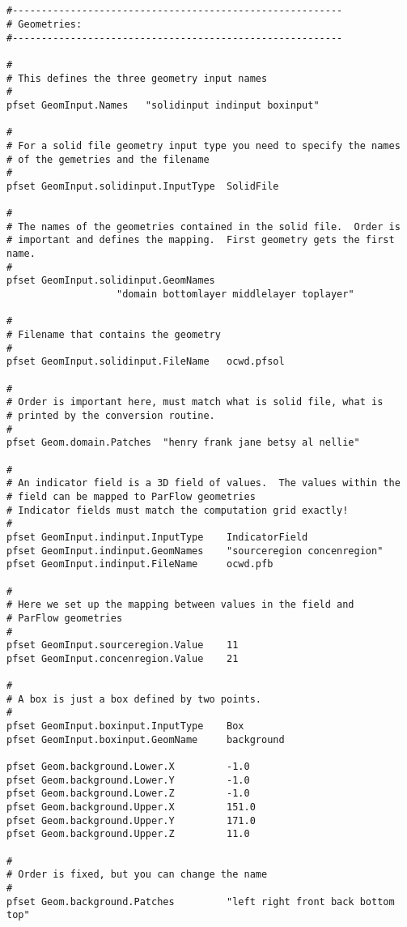 \begin{display}\begin{verbatim}


#---------------------------------------------------------
# Geometries:
#---------------------------------------------------------

#
# This defines the three geometry input names
# 
pfset GeomInput.Names   "solidinput indinput boxinput"

#
# For a solid file geometry input type you need to specify the names
# of the gemetries and the filename
# 
pfset GeomInput.solidinput.InputType  SolidFile

#
# The names of the geometries contained in the solid file.  Order is
# important and defines the mapping.  First geometry gets the first name.
#
pfset GeomInput.solidinput.GeomNames 
                   "domain bottomlayer middlelayer toplayer"

#
# Filename that contains the geometry
#
pfset GeomInput.solidinput.FileName   ocwd.pfsol
 
#
# Order is important here, must match what is solid file, what is 
# printed by the conversion routine.
#
pfset Geom.domain.Patches  "henry frank jane betsy al nellie"

#
# An indicator field is a 3D field of values.  The values within the
# field can be mapped to ParFlow geometries
# Indicator fields must match the computation grid exactly!  
# 
pfset GeomInput.indinput.InputType    IndicatorField
pfset GeomInput.indinput.GeomNames    "sourceregion concenregion"
pfset GeomInput.indinput.FileName     ocwd.pfb

#
# Here we set up the mapping between values in the field and
# ParFlow geometries
#
pfset GeomInput.sourceregion.Value    11
pfset GeomInput.concenregion.Value    21

#
# A box is just a box defined by two points.
# 
pfset GeomInput.boxinput.InputType    Box
pfset GeomInput.boxinput.GeomName     background
 
pfset Geom.background.Lower.X         -1.0
pfset Geom.background.Lower.Y         -1.0
pfset Geom.background.Lower.Z         -1.0
pfset Geom.background.Upper.X         151.0
pfset Geom.background.Upper.Y         171.0
pfset Geom.background.Upper.Z         11.0

# 
# Order is fixed, but you can change the name 
#
pfset Geom.background.Patches         "left right front back bottom top"
\end{verbatim}\end{display}

